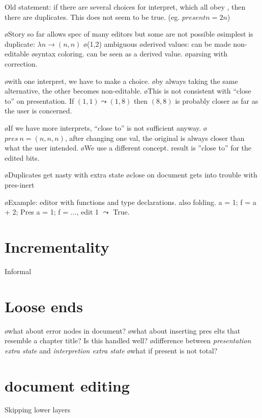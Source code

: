 Old statement: if there are several choices for interpret, which all obey , then there are duplicates. This does not seem to be true. (eg. $present n = 2n$)


\bl
\o Story so far allows spec of many editors but some are not possible
\o simplest is duplicate: $\lambda n \to (n,n)$
\o (1,2) ambiguous
\o derived values: can be made non-editable
\o syntax coloring. can be seen as a derived value.
\o parsing with correction. 
\el

\bl
\o with one interpret, we have to make a choice.
\o by always taking the same alternative, the other becomes non-editable.
\o This is not consistent with ``close to'' on presentation.  If $(1,1) \leadsto (1,8)$ then $(8,8)$ is probably closer as far as the user is concerned.
\el

\bl
\o If we have more interprets, ``close to'' is not sufficient anyway.
\o $pres~n = (n,n,n)$, after changing one val, the original is always closer than what the user intended.
\o We use a different concept. result is ''close to'' for the edited bits.
\el

\bl
\o Duplicates get nasty with extra state
\o close on document gets into trouble with pres-inert
\el

\bl
\o Example: editor with functions and type declarations. also folding. a = 1; f = a + 2; Pres a = 1; f = ..., edit 1 $\leadsto$ True. 
\el


%																
%																
%																
\section{Incrementality}
Informal


%																
%																
%																
\section{Loose ends}
\bl
\o what about error nodes in document?
\o what about inserting pres elts that resemble a chapter title? Is this handled well?
\o difference between {\em presentation extra state} and {\em interpretion extra state}
\o what if present is not total?
\el


%																
%																
%																
\section{document editing}
Skipping lower layers

